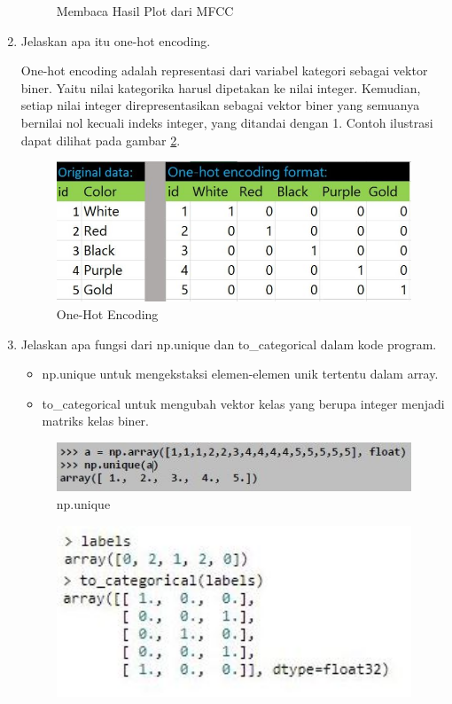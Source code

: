 \begin{enumerate}
\begin{figure}[!htbp]
	\caption{Membaca Hasil Plot dari MFCC}
	\label{c6_5}
\end{figure} 
\item Jelaskan apa itu one-hot encoding.
\par One-hot encoding adalah representasi dari variabel kategori sebagai vektor biner. Yaitu nilai kategorika harusl dipetakan ke nilai integer. Kemudian, setiap nilai integer direpresentasikan sebagai vektor biner yang semuanya bernilai nol kecuali indeks integer, yang ditandai dengan 1. Contoh ilustrasi dapat dilihat pada gambar \ref{c6_6}.
\begin{figure}[!htbp]
	\centerline{\includegraphics[width=1\textwidth]{figures/huda/chapter6/6.JPG}}
	\caption{One-Hot Encoding}
	\label{c6_6}
\end{figure} 
\item Jelaskan apa fungsi dari np.unique dan to\_categorical dalam kode program.
\begin{itemize}
\item np.unique untuk mengekstaksi elemen-elemen unik tertentu dalam array.
\item to\_categorical untuk mengubah vektor kelas yang berupa integer menjadi matriks kelas biner.
\end{itemize}
\begin{figure}[!htbp]
	\centerline{\includegraphics[width=1\textwidth]{figures/huda/chapter6/7.JPG}}
	\caption{np.unique}
\end{figure} 
\begin{figure}[!htbp]
	\centerline{\includegraphics[width=1\textwidth]{figures/huda/chapter6/7_1.JPG}}

\end{figure}
\end{enumerate}
